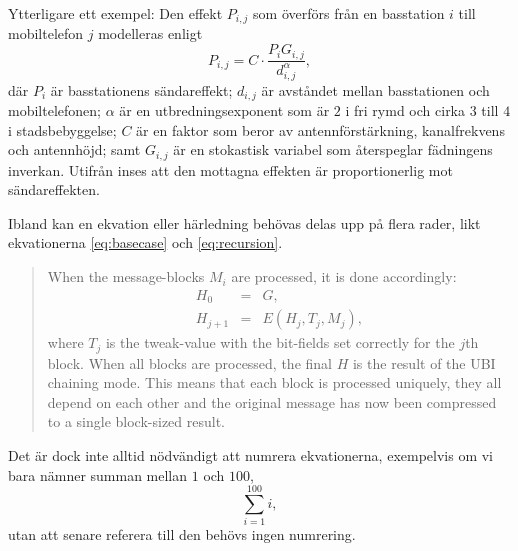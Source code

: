 Ytterligare ett exempel:
Den effekt \(P_{i,j}\) som överförs från en basstation \(i\) till mobiltelefon 
\(j\) modelleras enligt
\begin{equation}
	\label{eq:power}
	P_{i,j} = C\cdot \frac{P_i G_{i,j}}{d^\alpha_{i,j}},
\end{equation}
där \(P_i\) är basstationens sändareffekt; \(d_{i,j}\) är avståndet mellan 
basstationen och mobiltelefonen; \(\alpha\) är en utbredningsexponent som är 
\(2\) i fri rymd och cirka \(3\) till \(4\) i stadsbebyggelse; \(C\) är en 
faktor som beror av antennförstärkning, kanalfrekvens och antennhöjd; samt 
\(G_{i,j}\) är en stokastisk variabel som återspeglar fädningens inverkan.
Utifrån  inses att den mottagna effekten är proportionerlig 
mot sändareffekten.

Ibland kan en ekvation eller härledning behövas delas upp på flera rader, likt 
ekvationerna \eqref{eq:basecase} och \eqref{eq:recursion}.
\begin{quotation}
	When the message-blocks \(M_i\) are processed, it is done accordingly:
	\begin{eqnarray}
		\label{eq:basecase}
		H_0 &=& G, \\
		\label{eq:recursion}
		H_{j+1} &=& E(H_j, T_j, M_j),
	\end{eqnarray}
	where \(T_j\) is the tweak-value with the bit-fields set correctly for the
	\(j\)th block. When all blocks are processed, the final \(H\) is the result 
	of the UBI chaining mode.
	This means that each block is processed uniquely, they all depend on each 
	other and the original message has now been compressed to a single 
	block-sized result.
\end{quotation}

Det är dock inte alltid nödvändigt att numrera ekvationerna, exempelvis om vi 
bara nämner summan mellan \(1\) och \(100\),
\begin{equation}
	\nonumber
	\sum^{100}_{i=1} i,
\end{equation}
utan att senare referera till den behövs ingen numrering.
